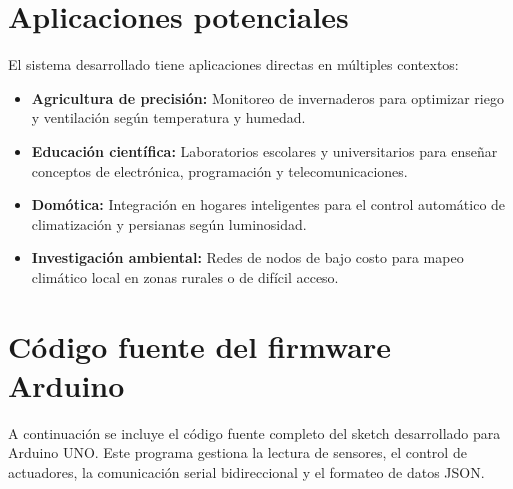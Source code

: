 \section{Aplicaciones potenciales}

El sistema desarrollado tiene aplicaciones directas en múltiples contextos:

\begin{itemize}[leftmargin=*]
    \item \textbf{Agricultura de precisión:} Monitoreo de invernaderos para optimizar riego y ventilación según temperatura y humedad.
    \item \textbf{Educación científica:} Laboratorios escolares y universitarios para enseñar conceptos de electrónica, programación y telecomunicaciones.
    \item \textbf{Domótica:} Integración en hogares inteligentes para el control automático de climatización y persianas según luminosidad.
    \item \textbf{Investigación ambiental:} Redes de nodos de bajo costo para mapeo climático local en zonas rurales o de difícil acceso.
\end{itemize}

\label{ch:anexos}

\section{Código fuente del firmware Arduino}

A continuación se incluye el código fuente completo del sketch desarrollado para Arduino UNO. Este programa gestiona la lectura de sensores, el control de actuadores, la comunicación serial bidireccional y el formateo de datos JSON.

